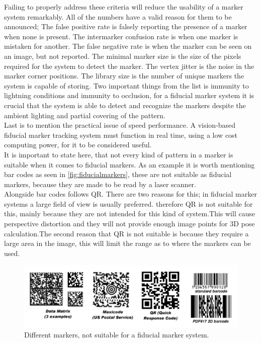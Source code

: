 			Failing to properly address these criteria will reduce the usability of a marker system remarkably\cite{fiducialMarkers}. All of the numbers have a valid reason for them to be announced; The false positive rate is falsely reporting the presence of a marker when none is present. The intermarker confusion rate is when one marker is mistaken for another. The false negative rate is when the marker can be seen on an image, but not reported. The minimal marker size is the size of the pixels required for the system to detect the marker. The vertex jitter is the noise in the marker corner positions. The library size is the number of unique markers the system is capable of storing. Two important things from the list is immunity to lightning conditions and immunity to occlusion, for a fiducial marker system it is crucial that the system is able to detect and recognize the markers despite the ambient lighting and partial covering of the pattern.\\
			Last is to mention the practical issue of speed performance. A vision-based fiducial marker tracking system must function in real time, using a low cost computing power, for it to be considered useful.\\
			
			It is important to state here, that not every kind of pattern in a marker is suitable when it comes to fiducial markers\cite{fiducialMarkers}. As an example it is worth mentioning bar codes as seen in \autoref{fig:fiducialmarkers}, these are not suitable as fiducial markers, because they are made to be read by a laser scanner.\\
			Alongside bar codes follows QR. There are two reasons for this; in fiducial marker systems a large field of view is usually preferred. therefore QR is not suitable for this, mainly because they are not intended for this kind of system.This will cause perspective distortion and they will not provide enough image points for 3D pose calculation.The second reason that QR is not suitable is because they require a large area in the image, this will limit the range as to where the markers can be used.\\ 
			
			
			\begin{figure}[H]
				\centering
				\includegraphics[width=0.9\linewidth]{figure/Analysis/fiducialmarkers.png}
				\caption{Different markers, not suitable for a fiducial marker system.}
				\label{fig:fiducialmarkers}
			\end{figure}
			
